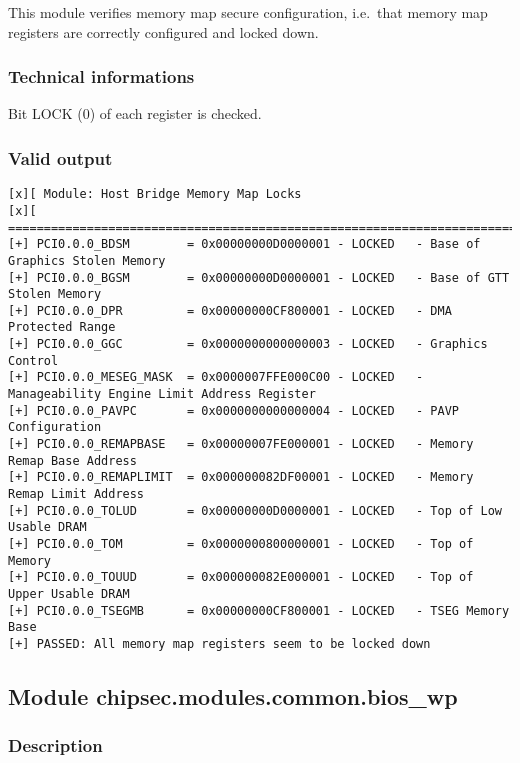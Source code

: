This module verifies memory map secure configuration, i.e.~that memory
map registers are correctly configured and locked down.

\hypertarget{technical-informations-11}{%
\subsubsection{Technical informations}\label{technical-informations-11}}

Bit LOCK (0) of each register is checked.

\hypertarget{valid-output-12}{%
\subsubsection{Valid output}\label{valid-output-12}}

\begin{verbatim}
[x][ Module: Host Bridge Memory Map Locks
[x][ =======================================================================
[+] PCI0.0.0_BDSM        = 0x00000000D0000001 - LOCKED   - Base of Graphics Stolen Memory
[+] PCI0.0.0_BGSM        = 0x00000000D0000001 - LOCKED   - Base of GTT Stolen Memory
[+] PCI0.0.0_DPR         = 0x00000000CF800001 - LOCKED   - DMA Protected Range
[+] PCI0.0.0_GGC         = 0x0000000000000003 - LOCKED   - Graphics Control
[+] PCI0.0.0_MESEG_MASK  = 0x0000007FFE000C00 - LOCKED   - Manageability Engine Limit Address Register
[+] PCI0.0.0_PAVPC       = 0x0000000000000004 - LOCKED   - PAVP Configuration
[+] PCI0.0.0_REMAPBASE   = 0x00000007FE000001 - LOCKED   - Memory Remap Base Address
[+] PCI0.0.0_REMAPLIMIT  = 0x000000082DF00001 - LOCKED   - Memory Remap Limit Address
[+] PCI0.0.0_TOLUD       = 0x00000000D0000001 - LOCKED   - Top of Low Usable DRAM
[+] PCI0.0.0_TOM         = 0x0000000800000001 - LOCKED   - Top of Memory
[+] PCI0.0.0_TOUUD       = 0x000000082E000001 - LOCKED   - Top of Upper Usable DRAM
[+] PCI0.0.0_TSEGMB      = 0x00000000CF800001 - LOCKED   - TSEG Memory Base
[+] PASSED: All memory map registers seem to be locked down
\end{verbatim}

\hypertarget{module-chipsec.modules.common.bios_wp}{%
\subsection{Module
chipsec.modules.common.bios\_wp}\label{module-chipsec.modules.common.bios_wp}}

\hypertarget{description-13}{%
\subsubsection{Description}\label{description-13}}

